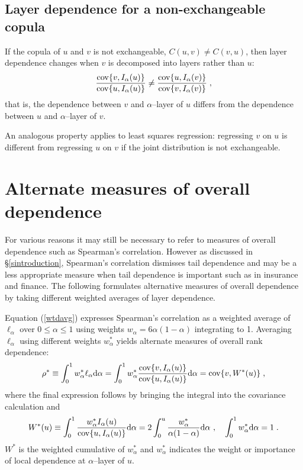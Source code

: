 \documentclass[authoryear]{elsarticle}
\newcommand{\cov}{{\rm cov}}
\newcommand{\de}{\mathrm{d}}
\newcommand{\cq}{\ ,\quad }
\newcommand{\eref}[1]{(\ref{#1})}
\newcommand{\sref}[1]{\S\ref{#1}}
\begin{document}
\subsection{Layer dependence for a non-exchangeable copula}

If the copula of $u$ and $v$ is not exchangeable, $C(u,v)\neq C(v,u)$, then layer dependence changes when $v$ is decomposed into layers rather than $u$:
$$
\frac{\cov\{v,I_\alpha(u)\}}{\cov\{u,I_\alpha(u)\}}
\neq \frac{\cov\{u,I_\alpha(v)\}}{\cov\{v,I_\alpha(v)\}}  \;,
$$
that is, the dependence between $v$ and $\alpha$--layer of $u$ differs from the dependence between $u$ and $\alpha$--layer of $v$.

An analogous property applies to least squares regression: regressing $v$ on $u$ is different from regressing $u$ on $v$ if the joint distribution is not exchangeable. 








\section{Alternate measures of overall dependence}\label{saltoverall}


For various reasons it may still be necessary to refer to measures of overall dependence such as Spearman's correlation. However as discussed in \sref{sintroduction}, Spearman's correlation dismisses tail dependence and may be a less appropriate measure when tail dependence is important such as in insurance and finance. The following formulates alternative measures of overall dependence by taking different weighted averages of layer dependence.


Equation \eref{wtdavg} expresses Spearman's correlation as a weighted average of $\ell_\alpha$ over $0\le\alpha\le 1$ using weights $w_\alpha=6\alpha(1-\alpha)$ integrating to 1. Averaging $\ell_\alpha$ using different weights $w^*_\alpha$ yields alternate measures of overall rank dependence:
$$
\rho^*\equiv  \int_0^1 w^*_\alpha \ell_\alpha \de \alpha 
= \int_0^1 w^*_\alpha \frac{ \cov\{v,I_\alpha(u)\}}{\cov\{u,I_\alpha(u)\}} \de \alpha=\cov\{v,W^*(u)\} \;,
$$
where the final expression follows by bringing the integral into the covariance calculation and
$$
W^*(u)\equiv \int_0^1 \frac{w^*_\alpha I_\alpha(u)}{\cov\{u,I_\alpha(u)\}}\de\alpha  
= 2\int_0^u \frac{w^*_\alpha }{\alpha(1-\alpha)}\de\alpha  
\cq \int_0^1 w_\alpha^* \de\alpha=1 \;.
$$
$W^*$ is the weighted cumulative of $w^*_\alpha$ and $w_\alpha^*$ indicates the weight or importance of local dependence at $\alpha$--layer of $u$. 
\end{document}

